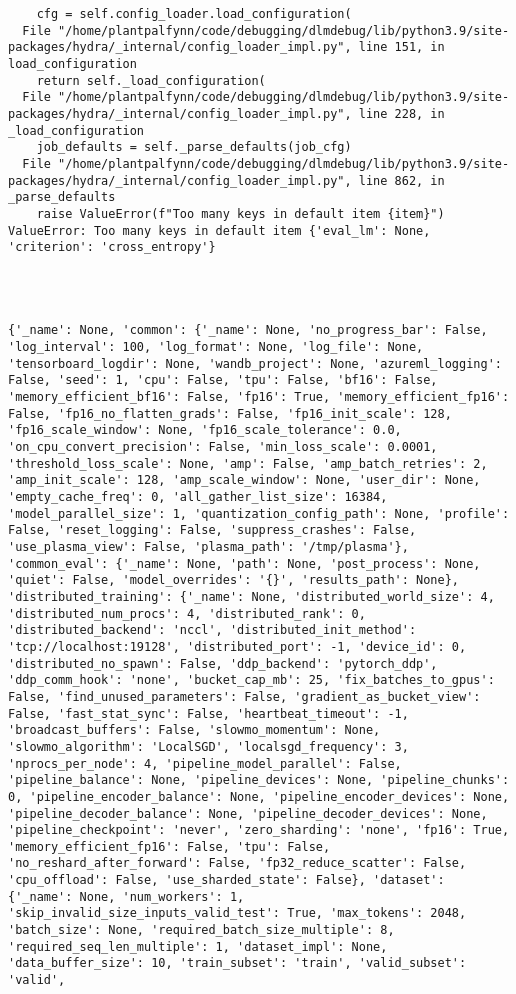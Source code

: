{{{{{{{{{{{{\begin{verbatim}
    cfg = self.config_loader.load_configuration(
  File "/home/plantpalfynn/code/debugging/dlmdebug/lib/python3.9/site-packages/hydra/_internal/config_loader_impl.py", line 151, in load_configuration
    return self._load_configuration(
  File "/home/plantpalfynn/code/debugging/dlmdebug/lib/python3.9/site-packages/hydra/_internal/config_loader_impl.py", line 228, in _load_configuration
    job_defaults = self._parse_defaults(job_cfg)
  File "/home/plantpalfynn/code/debugging/dlmdebug/lib/python3.9/site-packages/hydra/_internal/config_loader_impl.py", line 862, in _parse_defaults
    raise ValueError(f"Too many keys in default item {item}")
ValueError: Too many keys in default item {'eval_lm': None, 'criterion': 'cross_entropy'}




{'_name': None, 'common': {'_name': None, 'no_progress_bar': False, 'log_interval': 100, 'log_format': None, 'log_file': None, 'tensorboard_logdir': None, 'wandb_project': None, 'azureml_logging': False, 'seed': 1, 'cpu': False, 'tpu': False, 'bf16': False, 'memory_efficient_bf16': False, 'fp16': True, 'memory_efficient_fp16': False, 'fp16_no_flatten_grads': False, 'fp16_init_scale': 128, 'fp16_scale_window': None, 'fp16_scale_tolerance': 0.0, 'on_cpu_convert_precision': False, 'min_loss_scale': 0.0001, 'threshold_loss_scale': None, 'amp': False, 'amp_batch_retries': 2, 'amp_init_scale': 128, 'amp_scale_window': None, 'user_dir': None, 'empty_cache_freq': 0, 'all_gather_list_size': 16384, 'model_parallel_size': 1, 'quantization_config_path': None, 'profile': False, 'reset_logging': False, 'suppress_crashes': False, 'use_plasma_view': False, 'plasma_path': '/tmp/plasma'}, 'common_eval': {'_name': None, 'path': None, 'post_process': None, 'quiet': False, 'model_overrides': '{}', 'results_path': None}, 'distributed_training': {'_name': None, 'distributed_world_size': 4, 'distributed_num_procs': 4, 'distributed_rank': 0, 'distributed_backend': 'nccl', 'distributed_init_method': 'tcp://localhost:19128', 'distributed_port': -1, 'device_id': 0, 'distributed_no_spawn': False, 'ddp_backend': 'pytorch_ddp', 'ddp_comm_hook': 'none', 'bucket_cap_mb': 25, 'fix_batches_to_gpus': False, 'find_unused_parameters': False, 'gradient_as_bucket_view': False, 'fast_stat_sync': False, 'heartbeat_timeout': -1, 'broadcast_buffers': False, 'slowmo_momentum': None, 'slowmo_algorithm': 'LocalSGD', 'localsgd_frequency': 3, 'nprocs_per_node': 4, 'pipeline_model_parallel': False, 'pipeline_balance': None, 'pipeline_devices': None, 'pipeline_chunks': 0, 'pipeline_encoder_balance': None, 'pipeline_encoder_devices': None, 'pipeline_decoder_balance': None, 'pipeline_decoder_devices': None, 'pipeline_checkpoint': 'never', 'zero_sharding': 'none', 'fp16': True, 'memory_efficient_fp16': False, 'tpu': False, 'no_reshard_after_forward': False, 'fp32_reduce_scatter': False, 'cpu_offload': False, 'use_sharded_state': False}, 'dataset': {'_name': None, 'num_workers': 1, 'skip_invalid_size_inputs_valid_test': True, 'max_tokens': 2048, 'batch_size': None, 'required_batch_size_multiple': 8, 'required_seq_len_multiple': 1, 'dataset_impl': None, 'data_buffer_size': 10, 'train_subset': 'train', 'valid_subset': 'valid', 
\end{verbatim}}}}}}}}}}}}}
